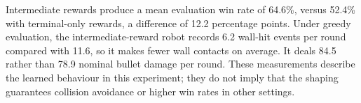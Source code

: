 Intermediate rewards produce a mean evaluation win rate of 64.6\%, versus 52.4\% with terminal-only rewards, a difference of 12.2 percentage points. Under greedy evaluation, the intermediate-reward robot records 6.2 wall-hit events per round compared with 11.6, so it makes fewer wall contacts on average. It deals 84.5 rather than 78.9 nominal bullet damage per round. These measurements describe the learned behaviour in this experiment; they do not imply that the shaping guarantees collision avoidance or higher win rates in other settings.\par

